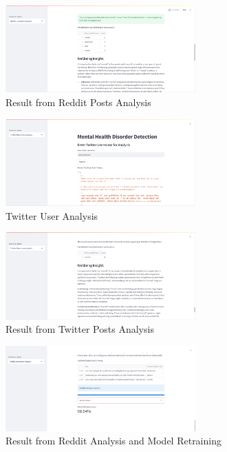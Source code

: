 \begin{figure}[h!]  
    \centering
    \includegraphics[width=0.65\textwidth]{App Images/07 Interface.png}  
    \caption{Result from Reddit Posts Analysis}
    \label{08i}  %
\end{figure}


\begin{figure}[h!]  
    \centering
    \includegraphics[width=0.65\textwidth]{App Images/08 Interface.png}  
    \caption{Twitter User Analysis}
    \label{09i}  %
\end{figure}

\begin{figure}[h!]  
    \centering
    \includegraphics[width=0.65\textwidth]{App Images/10 Interface.png}  
    \caption{Result from Twitter Posts Analysis}
    \label{10i}  %
\end{figure}

\begin{figure}[h!]  
    \centering
    \includegraphics[width=0.65\textwidth]{App Images/17 Interface.png}  
    \caption{Result from Reddit Analysis and Model Retraining}
    \label{10i}  %
\end{figure}


